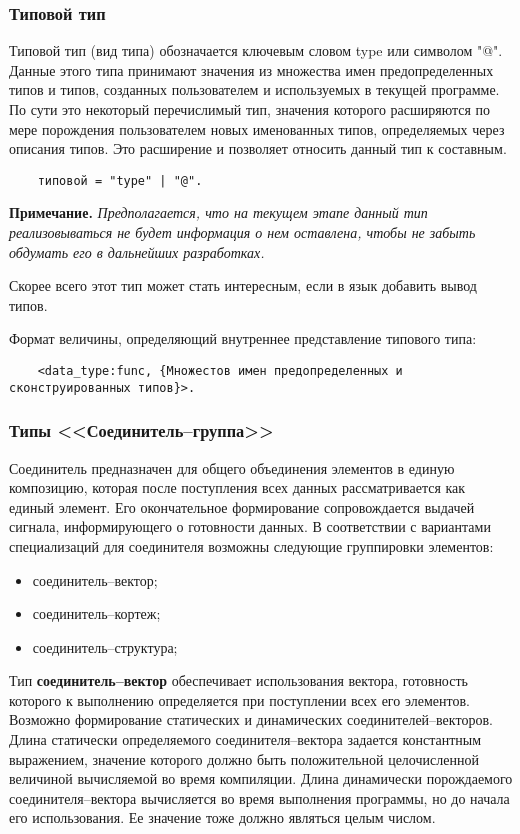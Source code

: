 {\subsubsection{Типовой тип}

Типовой тип (вид типа) обозначается ключевым словом type или символом "@". Данные этого типа принимают значения из множества имен предопределенных типов и типов, созданных пользователем и используемых в текущей программе. По сути это некоторый перечислимый тип, значения которого расширяются по мере порождения пользователем новых именованных типов, определяемых через описания типов. Это расширение и позволяет относить данный тип к составным.

\begin{verbatim}
	типовой = "type" | "@".
\end{verbatim}

\textbf{Примечание.}
\textit{Предполагается, что на текущем этапе данный тип реализовываться не будет информация о нем оставлена, чтобы не забыть обдумать его в дальнейших разработках.}

Скорее всего этот тип может стать интересным, если в язык добавить вывод типов.

Формат величины, определяющий внутреннее представление типового типа:

\begin{verbatim}
	<data_type:func, {Множестов имен предопределенных и сконструированных типов}>.
\end{verbatim}

\subsubsection{Типы <<Соединитель--группа>>}

Соединитель предназначен для общего объединения элементов в единую композицию, которая после поступления всех данных рассматривается как единый элемент. Его окончательное формирование сопровождается выдачей сигнала, информирующего о готовности данных. В соответствии с вариантами специализаций для соединителя возможны следующие группировки элементов:
\begin{itemize}
    \item соединитель--вектор;
    \item соединитель--кортеж;
    \item соединитель--структура;
\end{itemize}

Тип \textbf{соединитель--вектор} обеспечивает использования вектора, готовность которого к выполнению определяется при поступлении всех его элементов. Возможно формирование статических и динамических соединителей--векторов. Длина статически определяемого соединителя--вектора задается константным выражением, значение которого должно быть положительной целочисленной величиной вычисляемой во время компиляции. Длина динамически порождаемого соединителя--вектора вычисляется во время выполнения программы, но до начала его использования. Ее значение тоже должно являться целым числом.

}
